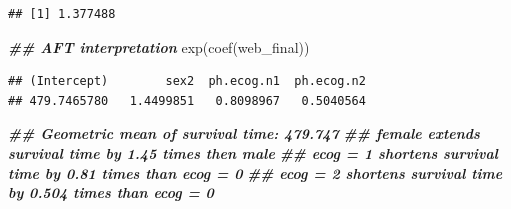 \documentclass[
]{article}
\newenvironment{Shaded}{\begin{snugshade}}{\end{snugshade}}
\newcommand{\DocumentationTok}[1]{\textcolor[rgb]{0.56,0.35,0.01}{\textbf{\textit{#1}}}}
\newcommand{\FunctionTok}[1]{\textcolor[rgb]{0.00,0.00,0.00}{#1}}
\newcommand{\NormalTok}[1]{#1}
\begin{document}
\begin{verbatim}
## [1] 1.377488
\end{verbatim}

\begin{Shaded}
\begin{Highlighting}[]
\DocumentationTok{\#\# AFT interpretation}
\FunctionTok{exp}\NormalTok{(}\FunctionTok{coef}\NormalTok{(web\_final))}
\end{Highlighting}
\end{Shaded}

\begin{verbatim}
## (Intercept)        sex2  ph.ecog.n1  ph.ecog.n2 
## 479.7465780   1.4499851   0.8098967   0.5040564
\end{verbatim}

\begin{Shaded}
\begin{Highlighting}[]
\DocumentationTok{\#\# Geometric mean of survival time: 479.747}
\DocumentationTok{\#\# female extends survival time by 1.45 times then male}
\DocumentationTok{\#\# ecog = 1 shortens survival time by 0.81 times than ecog = 0}
\DocumentationTok{\#\# ecog = 2 shortens survival time by 0.504 times than ecog = 0}
\end{Highlighting}
\end{Shaded}
\end{document}
